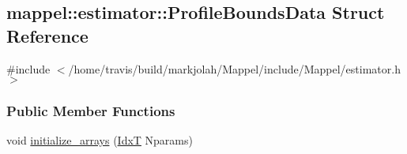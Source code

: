 \hypertarget{structmappel_1_1estimator_1_1ProfileBoundsData}{}\subsection{mappel\+:\+:estimator\+:\+:Profile\+Bounds\+Data Struct Reference}
\label{structmappel_1_1estimator_1_1ProfileBoundsData}


{\ttfamily \#include $<$/home/travis/build/markjolah/\+Mappel/include/\+Mappel/estimator.\+h$>$}

\subsubsection*{Public Member Functions}
\begin{DoxyCompactItemize}
\item 
void \hyperlink{structmappel_1_1estimator_1_1ProfileBoundsData_a5dbbab414cdb55bc5637deb195db6cf6}{initialize\+\_\+arrays} (\hyperlink{namespacemappel_ab17ec0f30b61ece292439d7ece81d3a8}{IdxT} Nparams)
\end{DoxyCompactItemize}
